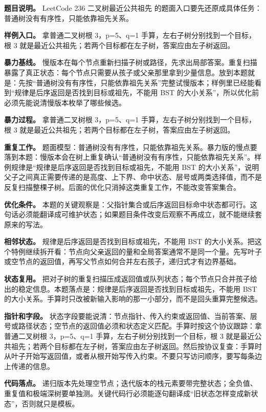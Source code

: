 \textbf{题目说明。} LeetCode 236 二叉树最近公共祖先 的题面入口要先还原成具体任务：普通树没有有序性，只能依靠祖先关系。

\textbf{样例入口。} 拿普通二叉树根 3，p=5、q=1 手算，左右子树分别找到一个目标，根 3 就是最近公共祖先；若两个目标都在左子树，答案应由左子树返回。

\textbf{暴力基线。} 慢版本在每个节点重新扫描子树或路径，先求出局部答案。重复扫描暴露了真正状态：每个节点只需要从孩子或父亲那里拿到少量信息。放到本题就是：先按“普通树没有有序性，只能依靠祖先关系”完整试慢版本；样例里已经能看到“规律是后序返回是否找到目标或祖先，不能用 BST 的大小关系”，所以优化前必须先能说清慢版本枚举了哪些候选。

\textbf{暴力过程。} 拿普通二叉树根 3，p=5、q=1 手算，左右子树分别找到一个目标，根 3 就是最近公共祖先；若两个目标都在左子树，答案应由左子树返回。

\textbf{重复工作。} 题面模型：普通树没有有序性，只能依靠祖先关系。暴力版的慢点要落到本题：慢版本会在树上重复确认“普通树没有有序性，只能依靠祖先关系”。样例规律是“规律是后序返回是否找到目标或祖先，不能用 BST 的大小关系”，说明父子之间真正需要传递的是高度、上下界、命中状态、层号或两类选择值，而不是反复扫描整棵子树。后面的优化只消掉这类重复工作，不能改变答案集合。

\textbf{优化条件。} 本题的关键观察是：父指针集合或后序返回目标命中状态都可行。这句话必须能翻译成可维护状态；如果题目条件改变后观察不再成立，就不能继续套原来的写法。

\textbf{相邻状态。} 规律是后序返回是否找到目标或祖先，不能用 BST 的大小关系。把这个特例继续拆开看：节点向父亲返回的量和全局答案通常不是同一个量。先写叶子或空节点的返回值，再写父节点如何合并左右孩子，递归式才有边界基础。

\textbf{状态复用。} 把对子树的重复扫描压成返回值或队列状态；每个节点只合并孩子给出的稳定信息。本题落点是：规律是后序返回是否找到目标或祖先，不能用 BST 的大小关系。手算时只改被新输入影响的那一小部分，而不是回头重算完整候选。

\textbf{指针和字段。} 状态字段要能说清：节点指针、传入约束或返回值、当前答案、层号或路径状态；空节点的返回值必须和状态定义匹配。手算时按这个协议跟踪：拿普通二叉树根 3，p=5、q=1 手算，左右子树分别找到一个目标，根 3 就是最近公共祖先；若两个目标都在左子树，答案应由左子树返回。然后按协议复查：手算时从叶子开始写返回值，或者从根开始写传入约束。不要只写访问顺序，要写每条边上传递的信息。

\textbf{代码落点。} 递归版本先处理空节点；迭代版本的栈元素要带完整状态；全负值、重复值和极端深树要单独测。关键代码行必须能逐句翻译成“旧状态怎样变成新状态”，否则就只是模板。

